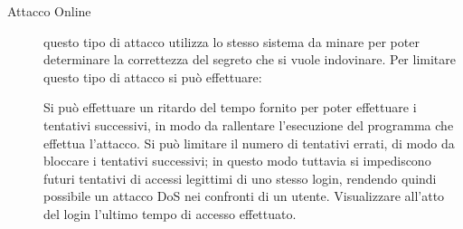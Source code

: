 \begin{description}
\item[Attacco Online] questo tipo di attacco utilizza lo stesso sistema da minare
	per poter determinare la correttezza del segreto che si vuole indovinare.
	Per limitare questo tipo di attacco si può effettuare:
	\begin{itemize}
	\diam Si può effettuare un ritardo del tempo fornito per poter effettuare
		i tentativi successivi, in modo da rallentare l'esecuzione del
		programma che effettua l'attacco.
	\diam Si può limitare il numero di tentativi errati, di modo da bloccare
		i tentativi successivi; in questo modo tuttavia si impediscono
		futuri tentativi di accessi legittimi di uno stesso login,
		rendendo quindi possibile un attacco DoS nei confronti di un utente.
	\diam Visualizzare all'atto del login l'ultimo tempo di accesso effettuato.
	\end{itemize}
	
\end{description}

